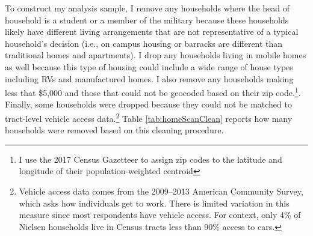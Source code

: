 \documentclass[AER]{AEA_mal}
\begin{document}
To construct my analysis sample, I remove any households where the head of household is a student or a member of the military because these households likely have different living arrangements that are not representative of a typical household's decision (i.e., on campus housing or barracks are different than traditional homes and apartments). I drop any households living in mobile homes as well because this type of housing could include a wide range of house types including RVs and manufactured homes. I also remove any households making less that \$5,000 and those that could not be geocoded based on their zip code.\footnote{I use the 2017 Census Gazetteer to assign zip codes to the latitude and longitude of their population-weighted centroid}. Finally, some households were dropped because they could not be matched to tract-level vehicle access data.\footnote{Vehicle access data comes from the 2009--2013 American Community Survey, which asks how individuals get to work. There is limited variation in this measure since most respondents have vehicle access. For context, only 4\% of Nielsen households live in Census tracts less than 90\% access to cars.} Table \ref{tab:homeScanClean} reports how many households were removed based on this cleaning procedure.


\end{document}
